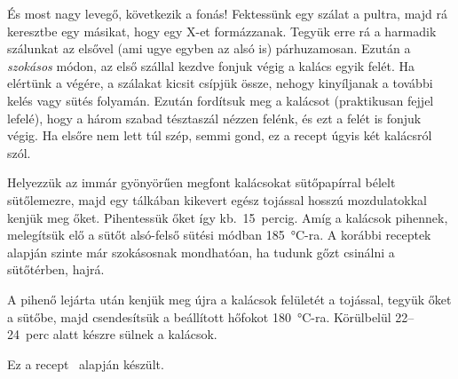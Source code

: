 És most nagy levegő, következik a fonás! Fektessünk egy szálat a pultra, majd rá keresztbe egy másikat, hogy egy X-et formázzanak. Tegyük erre rá a harmadik szálunkat az elsővel (ami ugye egyben az alsó is) párhuzamosan. Ezután a \emph{szokásos} módon, az első szállal kezdve fonjuk végig a kalács egyik felét. Ha elértünk a végére, a szálakat kicsit csípjük össze, nehogy kinyíljanak a további kelés vagy sütés folyamán. Ezután fordítsuk meg a kalácsot (praktikusan fejjel lefelé), hogy a három szabad tésztaszál nézzen felénk, és ezt a felét is fonjuk végig. Ha elsőre nem lett túl szép, semmi gond, ez a recept úgyis két kalácsról szól.

Helyezzük az immár gyönyörűen megfont kalácsokat sütőpapírral bélelt sütőlemezre, majd egy tálkában kikevert egész tojással hosszú mozdulatokkal kenjük meg őket. Pihentessük őket így kb.~\num{15}~percig. Amíg a kalácsok pihennek, melegítsük elő a sütőt alsó-felső sütési módban \qty{185}{\celsius}-ra. A korábbi receptek alapján szinte már szokásosnak mondhatóan, ha tudunk gőzt csinálni a sütőtérben, hajrá.

A pihenő lejárta után kenjük meg újra a kalácsok felületét a tojással, tegyük őket a sütőbe, majd csendesítsük a beállított hőfokot \qty{180}{\celsius}-ra. Körülbelül \numrange{22}{24}~perc alatt készre sülnek a kalácsok.

Ez a recept~\cite{szabi_kalacs} alapján készült.
